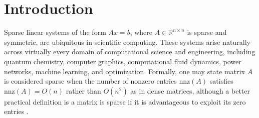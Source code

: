 \chapter{Introduction}
\label{ch:introduction}



Sparse linear systems of the form $Ax = b$, where $A \in \mathbb{R}^{n \times n}$ is sparse and symmetric, are ubiquitous in scientific computing. These systems arise naturally across virtually every domain of computational science and engineering, including quantum chemistry, computer graphics, computational fluid dynamics, power networks, machine learning, and optimization. Formally, one may state matrix $A$ is considered sparse when the number of nonzero entries $\text{nnz}(A)$ satisfies $\text{nnz}(A) = O(n)$ rather than $O(n^2)$ as in dense matrices, although a better practical definition is a matrix is sparse if it is advantageous to exploit its zero entries \cite{scott_introduction_2023}.



